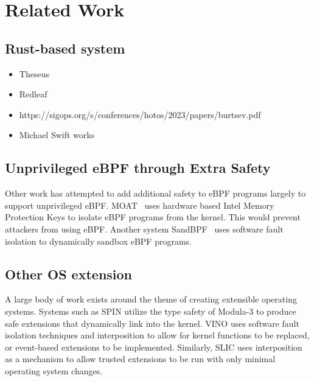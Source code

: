 \section{Related Work}
\subsection{Rust-based system}
\begin{itemize}
    \item Theseus
    \item Redleaf
    \item https://sigops.org/s/conferences/hotos/2023/papers/burtsev.pdf
    \item Michael Swift works
\end{itemize}

\subsection{Unprivileged eBPF through Extra Safety}
Other work has attempted to add additional safety to eBPF programs largely
    to support unprivileged eBPF.
MOAT~\cite{lu2023moat} uses hardware based Intel Memory Protection Keys 
    to isolate eBPF programs from the kernel.
This would prevent attackers from using eBPF.
Another system SandBPF~\cite{sandbpf} uses software fault isolation to dynamically
    sandbox eBPF programs.

\subsection{Other OS extension}
A large body of work exists around the theme of creating extensible operating systems.
Systems such as SPIN \cite{spin} utilize the type safety of Modula-3 to produce safe extensions that dynamically link into the kernel.
VINO \cite{vino} uses software fault isolation techniques and interposition to allow for kernel functions to be replaced, or event-based extensions to be implemented.
Similarly, SLIC \cite{slic} uses interposition as a mechanism to allow trusted extensions to be run with only minimal operating system changes.
